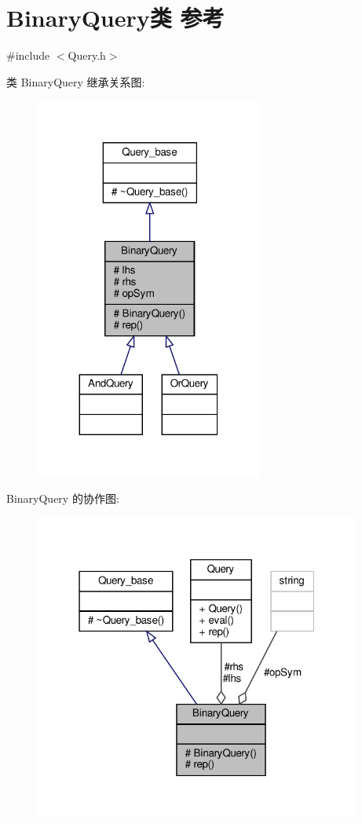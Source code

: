 \hypertarget{classBinaryQuery}{}\section{Binary\+Query类 参考}
\label{classBinaryQuery}


{\ttfamily \#include $<$Query.\+h$>$}



类 Binary\+Query 继承关系图\+:\nopagebreak
\begin{figure}[H]
\begin{center}
\leavevmode
\includegraphics[width=212pt]{classBinaryQuery__inherit__graph}
\end{center}
\end{figure}


Binary\+Query 的协作图\+:\nopagebreak
\begin{figure}[H]
\begin{center}
\leavevmode
\includegraphics[width=304pt]{classBinaryQuery__coll__graph}
\end{center}
\end{figure}
